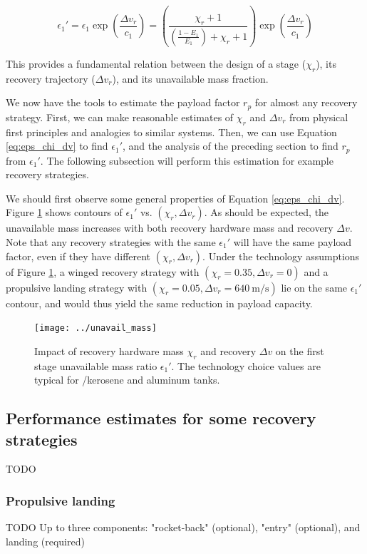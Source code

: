 \documentclass[conf]{new-aiaa}
\begin{document}
\begin{equation}
\label{eq:eps_chi_dv}
\epsilon_1' = \epsilon_1 \exp\left( \frac{\Delta v_r}{c_1} \right) = \left( \frac{\chi_r + 1}{\left(\frac{1 - E_1}{E_1} \right) + \chi_r + 1} \right) \exp\left( \frac{\Delta v_r}{c_1} \right)
\end{equation}

This provides a fundamental relation between the design of a stage ($\chi_r$), its recovery trajectory ($\Delta v_r$), and its unavailable mass fraction.

We now have the tools to estimate the payload factor $r_p$ for almost any recovery strategy. First, we can make reasonable estimates of $\chi_r$ and $\Delta v_r$ from physical first principles and analogies to similar systems. Then, we can use Equation \ref{eq:eps_chi_dv} to find $\epsilon_1'$, and the analysis of the preceding section to find $r_p$ from $\epsilon_1'$. The following subsection will perform this estimation for example recovery strategies.

We should first observe some general properties of Equation \ref{eq:eps_chi_dv}. Figure \ref{fig:unavail_mass} shows contours of $\epsilon_1'$ vs. $(\chi_r, \Delta v_r)$. As should be expected, the unavailable mass increases with both recovery hardware mass and recovery $\Delta v$. Note that any recovery strategies with the same $\epsilon_1'$ will have the same payload factor, even if they have different $(\chi_r, \Delta v_r)$. Under the technology assumptions of Figure \ref{fig:unavail_mass}, a winged recovery strategy with $(\chi_r=0.35, \Delta v_r=0)$ and a propulsive landing strategy with $(\chi_r=0.05, \Delta v_r=\SI{640}{\meter\per\second})$ lie on the same $\epsilon_1'$ contour, and would thus  yield the same reduction in payload capacity.

\begin{figure}[hbt!]
	\centering
	\texttt{[image: ../unavail\_mass]}
	\label{fig:unavail_mass}
	\caption{Impact of recovery hardware mass $\chi_r$ and recovery $\Delta v$ on the first stage unavailable mass ratio $\epsilon_1'$. The technology choice values are typical for /kerosene and aluminum tanks.}
\end{figure}


\subsection{Performance estimates for some recovery strategies}
TODO

\subsubsection{Propulsive landing}
TODO
Up to three components: "rocket-back" (optional), "entry" (optional), and landing (required)
\end{document}
